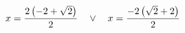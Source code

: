 \documentclass[preview]{standalone}
\begin{document}
\begin{align*}
\special{dvisvgm:raw <g id='unique000'>}x=\frac{2 \left(-2 + \sqrt{2}\right)}{2} \quad \lor \quad x=\frac{- 2 \left(\sqrt{2} + 2\right)}{2}\special{dvisvgm:raw </g>}
\end{align*}
\end{document}

